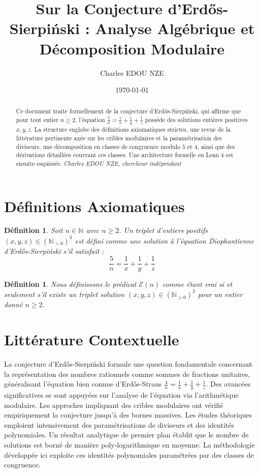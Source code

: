 \documentclass[12pt, a4paper]{article}
\title{Sur la Conjecture d'Erd\H{o}s-Sierpi\'nski : Analyse Alg\'ebrique et D\'ecomposition Modulaire}
\author{Charles EDOU NZE}
\date{\today}
\newtheorem{definition}[theorem]{D\'efinition}
\begin{document}
\maketitle
\thispagestyle{empty}


\begin{abstract}
Ce document traite formellement de la conjecture d'Erd\H{o}s-Sierpi\'nski, qui affirme que pour tout entier $n \ge 2$, l'\'equation $\frac{5}{n} = \frac{1}{x} + \frac{1}{y} + \frac{1}{z}$ poss\`ede des solutions enti\`eres positives $x, y, z$. La structure englobe des d\'efinitions axiomatiques strictes, une revue de la litt\'erature pertinente ax\'ee sur les cribles modulaires et la param\'etrisation des diviseurs, une d\'ecomposition en classes de congruence modulo $5$ et $4$, ainsi que des d\'erivations d\'etaill\'ees couvrant ces classes. Une architecture formelle en Lean 4 est ensuite esquiss\'ee.
\vfill
\noindent \textit{Charles EDOU NZE, chercheur ind\'ependant}
\end{abstract}

\tableofcontents
\newpage

\section{D\'efinitions Axiomatiques}

\begin{definition}
Soit $n \in \mathbb{N}$ avec $n \ge 2$. Un triplet d'entiers positifs $(x, y, z) \in (\mathbb{N}_{>0})^3$ est d\'efini comme une solution \`a l'\'equation Diophantienne d'Erd\H{o}s-Sierpi\'nski s'il satisfait :
\[ \frac{5}{n} = \frac{1}{x} + \frac{1}{y} + \frac{1}{z} \]
\end{definition}

\begin{definition}
Nous d\'efinissons le pr\'edicat $\mathcal{E}(n)$ comme \'etant vrai si et seulement s'il existe un triplet solution $(x, y, z) \in (\mathbb{N}_{>0})^3$ pour un entier donn\'e $n \ge 2$.
\end{definition}

\section{Litt\'erature Contextuelle}

La conjecture d'Erd\H{o}s-Sierpi\'nski formule une question fondamentale concernant la repr\'esentation des nombres rationnels comme sommes de fractions unitaires, g\'en\'eralisant l'\'equation bien connue d'Erd\H{o}s-Straus $\frac{4}{n} = \frac{1}{x} + \frac{1}{y} + \frac{1}{z}$. Des avanc\'ees significatives se sont appuy\'ees sur l'analyse de l'\'equation via l'arithm\'etique modulaire. Les approches impliquant des cribles modulaires ont v\'erifi\'e empiriquement la conjecture jusqu'\`a des bornes massives. Les \'etudes th\'eoriques emploient intensivement des param\'etrisations de diviseurs et des identit\'es polynomiales. Un r\'esultat analytique de premier plan \'etablit que le nombre de solutions est born\'e de mani\`ere poly-logarithmique en moyenne. La m\'ethodologie d\'evelopp\'ee ici exploite ces identit\'es polynomiales param\'etr\'ees par des classes de congruence.
\end{document}
